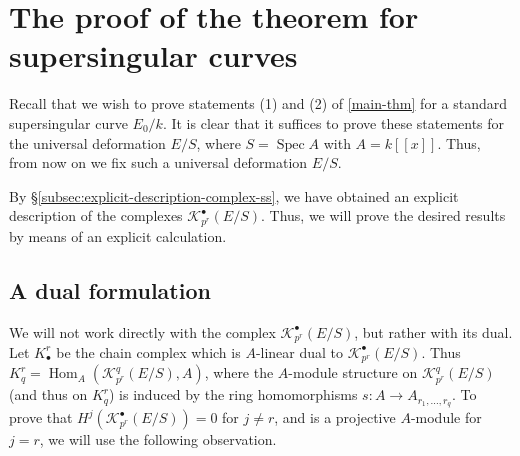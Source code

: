 \documentclass[11pt]{amsart}
\numberwithin{equation}{section}
\theoremstyle{plain}
\theoremstyle{remark}
\theoremstyle{plain}
\begin{document}
\section{The proof of the theorem for supersingular curves}
\label{sec:case-C}

Recall that we wish to prove statements (1) and (2) of
\eqref{main-thm} for a standard
supersingular curve $E_0/k$.  It is clear that it
suffices to prove these statements for the universal deformation
$E/S$, where $S={\operatorname{Spec}} A$ with $A=k{[\![{x}]\!]}$.  Thus, from now on we
fix such a 
universal deformation $E/S$. 

By \S\ref{subsec:explicit-description-complex-ss}, we have obtained an
explicit description of 
the complexes ${\mathscr{K}}_{p^r}^\bullet(E/S)$.  Thus, we will prove the
desired results  by means of an explicit
calculation. 

\subsection{A dual formulation}

We will not work directly with the complex ${\mathscr{K}}_{p^r}^\bullet(E/S)$,
but rather with its dual.
Let $K_\bullet^r$ be the chain complex which is $A$-linear dual to
${\mathscr{K}}^\bullet_{p^r}(E/S)$.   Thus $K_q^r = {{\operatorname{Hom}}}_A({\mathscr{K}}^q_{p^r}(E/S),A)$,
where the $A$-module structure on ${\mathscr{K}}^q_{p^r}(E/S)$ (and thus on $K_q^r$)
is induced by the ring homomorphisms $s\colon A{\rightarrow}
A_{r_1,\dots,r_q}$. 
To prove that $H^j({\mathscr{K}}^\bullet_{p^r}(E/S))=0$ for $j\neq r$, and is a
projective $A$-module for $j=r$, we will use the following observation.
\end{document}
